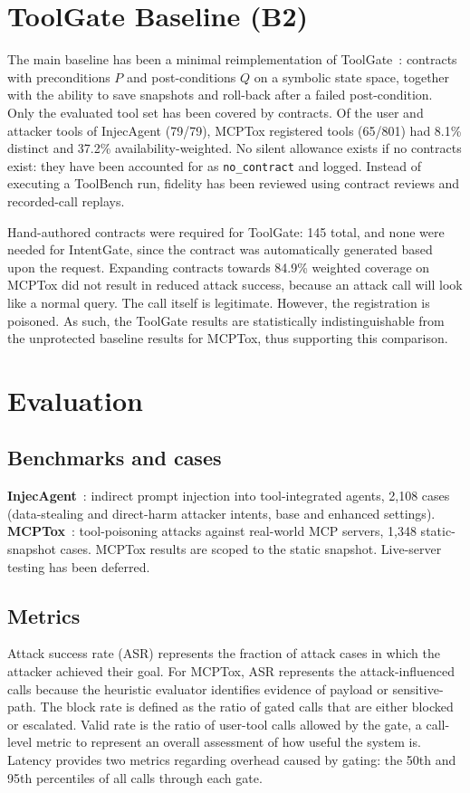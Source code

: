 \documentclass[a4paper,conference]{IEEEtran}
\begin{document}
\section{ToolGate Baseline (B2)}

The main baseline has been a minimal reimplementation of ToolGate~\cite{liu2026toolgate}: contracts with preconditions $P$ and post-conditions $Q$ on a symbolic state space, together with the ability to save snapshots and roll-back after a failed post-condition. Only the evaluated tool set has been covered by contracts. Of the user and attacker tools of InjecAgent (79/79), MCPTox registered tools (65/801) had 8.1\% distinct and 37.2\% availability-weighted. No silent allowance exists if no contracts exist: they have been accounted for as \texttt{no\_contract} and logged. Instead of executing a ToolBench run, fidelity has been reviewed using contract reviews and recorded-call replays.

Hand-authored contracts were required for ToolGate: 145 total, and none were needed for IntentGate, since the contract was automatically generated based upon the request. Expanding contracts towards 84.9\% weighted coverage on MCPTox did not result in reduced attack success, because an attack call will look like a normal query. The call itself is legitimate. However, the registration is poisoned. As such, the ToolGate results are statistically indistinguishable from the unprotected baseline results for MCPTox, thus supporting this comparison.

\section{Evaluation}

\subsection{Benchmarks and cases}
\textbf{InjecAgent}~\cite{zhan2024injecagent}: indirect prompt injection into tool-integrated agents, 2,108 cases (data-stealing and direct-harm attacker intents, base and enhanced settings). \textbf{MCPTox}~\cite{wang2026mcptox}: tool-poisoning attacks against real-world MCP servers, 1,348 static-snapshot cases. MCPTox results are scoped to the static snapshot. Live-server testing has been deferred.

\subsection{Metrics}
Attack success rate (ASR) represents the fraction of attack cases in which the attacker achieved their goal. For MCPTox, ASR represents the attack-influenced calls because the heuristic evaluator identifies evidence of payload or sensitive-path. The block rate is defined as the ratio of gated calls that are either blocked or escalated. Valid rate is the ratio of user-tool calls allowed by the gate, a call-level metric to represent an overall assessment of how useful the system is. Latency provides two metrics regarding overhead caused by gating: the 50th and 95th percentiles of all calls through each gate.
\end{document}
